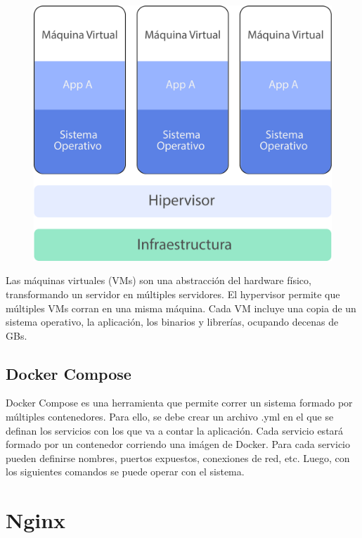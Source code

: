 \begin{figure}[h!]
  \centering
    \includegraphics[scale=0.7]{images/vms.png}
  \label{fig:vm}
\end{figure}

\break

Las máquinas virtuales (VMs) son una abstracción del hardware físico, transformando un servidor en múltiples servidores. El hypervisor permite que múltiples VMs corran en una misma máquina. Cada VM incluye una copia de un sistema operativo, la aplicación, los binarios y librerías, ocupando decenas de GBs.


\subsection[Docker Compose]{Docker Compose}

Docker Compose es una herramienta que permite correr un sistema formado por múltiples contenedores. Para ello, se debe crear un archivo .yml en el que se definan los servicios con los que va a contar la aplicación. Cada servicio estará formado por un contenedor corriendo una imágen de Docker. 
Para cada servicio pueden definirse nombres, puertos expuestos, conexiones de red, etc. Luego, con los siguientes comandos se puede operar con el sistema.

\section[Nginx]{Nginx}

